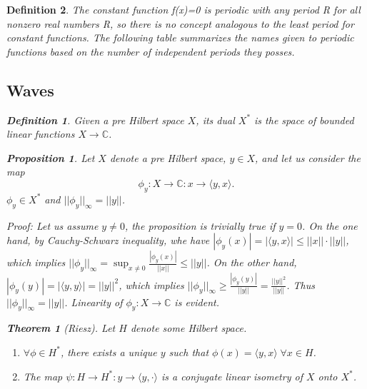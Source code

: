 \documentclass[ams,fleqn,amsmath,amssymb]{article}
\newcommand{\beq}{\begin{equation}}
\newcommand{\eeq}{\end{equation}}
\newtheorem{theorem}{Theorem}%
\newtheorem{proposition}{Proposition}%
\newtheorem{definition}{Definition}%
\begin{document}
\begin{}
\begin{definition}
  The constant function f(x)=0 is periodic with any period R for all nonzero real numbers R, so there is no concept analogous to the least period for constant functions. The following table summarizes the names given to periodic functions based on the number of independent periods they posses.
  
  \subsection{Waves}
  
  \begin{definition} Given a pre Hilbert space $X$, its dual $X^*$ is the space of bounded linear functions $X \to \mathbb C$.
  
  \end{definition}
  
  \begin{proposition} Let $X$ denote a pre Hilbert space, $y \in X$, and let us consider the map 
  \beq
  \phi_y : X \to  \mathbb C : x \to \langle y, x \rangle.
  \eeq
  $ \phi_y \in  X^* $ and $ || \phi_y ||_\infty = || y || $.
  
  \end{proposition}
  
  \textit{Proof:} Let us assume $y \neq 0$, the proposition is trivially true if $y=0$. On the one hand, by Cauchy-Schwarz inequality, whe have $|\phi_y(x)| = | \langle y, x \rangle | \leq || x || \cdot || y ||$, which implies $|| \phi_y ||_\infty = \sup_{x \neq 0} \frac{|\phi_y( x ) |}{ || x || } \leq || y ||$. On the other hand, $|\phi_y(y)| = | \langle y, y \rangle | = || y ||^2$, which implies $|| \phi_y ||_\infty \geq \frac{|\phi_y( y ) |}{ || y || } = \frac{ || y ||^2 }{ || y || }$. Thus $ || \phi_y ||_\infty = || y || $. Linearity of $\phi_y : X \to \mathbb C$ is evident.   
  
  \begin{theorem}[Riesz] Let $H$ denote some Hilbert space. 
  
  \begin{enumerate}
  
  \item
  $\forall \phi \in H^*$, there exists a unique $y$ such that $\phi(x) = \langle y, x \rangle \; \forall x \in H$.
  
  \item
  The map $\psi: H \to H^*: y \to \langle y, \cdot \rangle$ is a conjugate linear isometry of $X$ onto $X^*$.
  

\end{enumerate}
\end{theorem}
\end{definition}
\end{}
\end{document}

